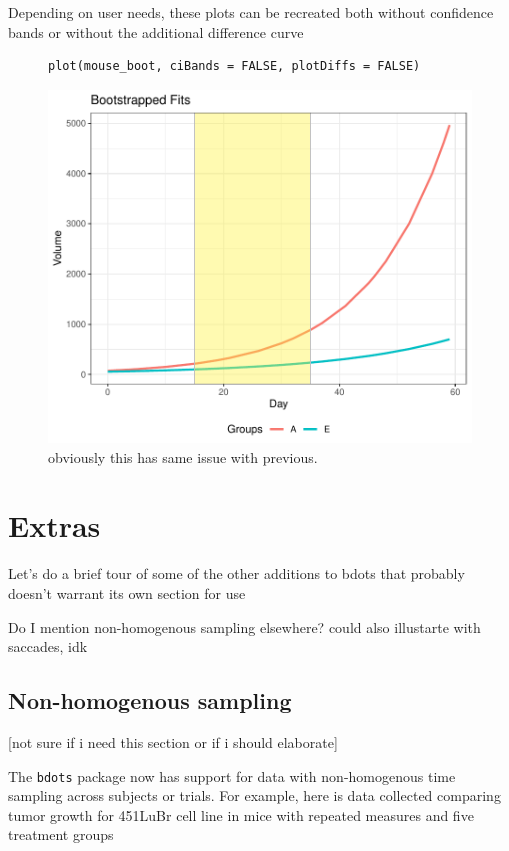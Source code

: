 \documentclass{article}
\begin{document}
Depending on user needs, these plots can be recreated both without confidence bands or without the additional difference curve

\begin{figure}[h]
\centering
\begin{BVerbatim}
plot(mouse_boot, ciBands = FALSE, plotDiffs = FALSE)
\end{BVerbatim}


\includegraphics{img/mouse_boot_plot_extra.pdf}
\caption{obviously this has same issue with previous.}
\end{figure}


\section{Extras}

Let's do a brief tour of some of the other additions to bdots that probably doesn't warrant its own section for use

Do I mention non-homogenous sampling elsewhere? could also illustarte with saccades, idk

\subsection{Non-homogenous sampling}

[not sure if i need this section or if i should elaborate]

The \texttt{bdots} package now has support for data with non-homogenous time sampling across subjects or trials. For example, here is data collected comparing tumor growth for 451LuBr cell line in mice with repeated measures and five treatment groups
\end{document}
